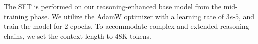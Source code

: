The SFT is performed on our reasoning-enhanced base model from the mid-training phase. 
We utilize the AdamW optimizer with a learning rate of $3e\text{-}5$, and train the model for $2$ epochs. 
To accommodate complex and extended reasoning chains, we set the context length to $48$K tokens.



